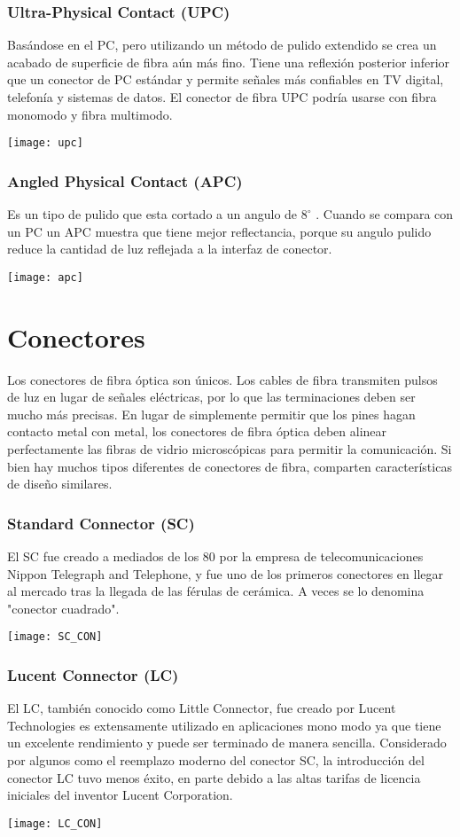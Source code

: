 \subsubsection*{Ultra-Physical Contact (UPC)}
Basándose en el PC, pero utilizando un método de pulido extendido se crea un acabado de superficie de fibra aún más fino. Tiene una reflexión posterior inferior que un conector de PC estándar y permite señales más confiables en TV digital, telefonía y sistemas de datos. El conector de fibra UPC podría usarse con fibra monomodo y fibra multimodo.
\begin{center}
\texttt{[image: upc]}
\end{center}
\subsubsection*{Angled Physical Contact (APC)}
Es un tipo de pulido que esta cortado a un angulo de $8^{\circ}$ . Cuando se compara con un PC un APC muestra que tiene mejor reflectancia, porque su angulo pulido reduce la cantidad de luz reflejada a la interfaz de conector.
\begin{center}
\texttt{[image: apc]}
\end{center}
\section{Conectores}
Los conectores de fibra óptica son únicos. Los cables de fibra transmiten pulsos de luz en lugar de señales eléctricas, por lo que las terminaciones deben ser mucho más precisas. En lugar de simplemente permitir que los pines hagan contacto metal con metal, los conectores de fibra óptica deben alinear perfectamente las fibras de vidrio microscópicas para permitir la comunicación. Si bien hay muchos tipos diferentes de conectores de fibra, comparten características de diseño similares.
\subsubsection*{Standard Connector (SC)}
El SC fue creado a mediados de los 80 por la empresa de telecomunicaciones Nippon Telegraph and Telephone, y fue uno de los primeros conectores en llegar al mercado tras la llegada de las férulas de cerámica. A veces se lo denomina "conector cuadrado".
\begin{center}
\texttt{[image: SC\_CON]}
\end{center}
\subsubsection*{Lucent Connector (LC)}
El LC, también conocido como Little Connector, fue creado por Lucent Technologies es extensamente utilizado en aplicaciones mono modo ya que tiene un excelente rendimiento y puede ser terminado de manera sencilla. Considerado por algunos como el reemplazo moderno del conector SC, la introducción del conector LC tuvo menos éxito, en parte debido a las altas tarifas de licencia iniciales del inventor Lucent Corporation.
\begin{center}
\texttt{[image: LC\_CON]}
\end{center}
